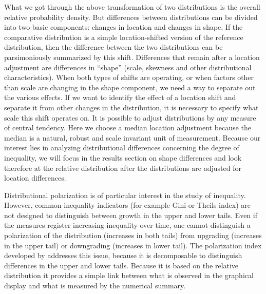 \documentclass[twoside]{article}\usepackage[]{graphicx}\usepackage[]{color}
\begin{document}
\begin{multicols}{2}
What we got through the above transformation of two distributions is the overall relative probability density. But differences between distributions can be divided into two basic components: changes in location and changes in shape. If the comparative distribution is a simple location-shifted version of the reference distribution, then the difference between the two distributions can be parsimoniously summarized by this shift. Differences that remain after a location adjustment are differences in ``shape'' (scale, skewness and other distributional characteristics). When both types of shifts are operating, or when factors other than scale are changing in the shape component, we need a way to separate out the various effects. If we want to identify the effect of a location shift and separate it from other changes in the distribution, it is necessary to specify what scale this shift operates on. It is possible to adjust distributions by any measure of central tendency. Here we choose a median location adjustment because the median is a natural, robust and scale invariant unit of measurement. Because our interest lies in analyzing distributional differences concerning the degree of inequality, we will focus in the results section on shape differences and look therefore at the relative distribution after the distributions are adjusted for location differences. 

Distributional polarization is of particular interest in the study of inequality. However, common inequality indicators (for example Gini or Theils index) are not designed to distinguish between growth in the upper and lower tails. Even if the measures register increasing inequality over time, one cannot distinguish a polarization of the distribution (increases in both tails) from upgrading (increases in the upper tail) or downgrading (increases in lower tail). The polarization index developed by \citep{Handock and Morris 1999} addresses this issue, because it is decomposable to distinguish differences in the upper and lower tails.  Because it is based on the relative distribution it provides a simple link between what is observed in the graphical display and what is measured by the numerical summary. \\


\end{multicols}
\end{document}
